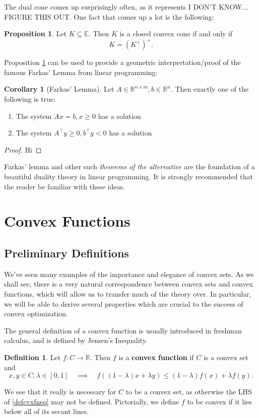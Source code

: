 \documentclass{article}
\numberwithin{equation}{section}
\theoremstyle{definition}
\newtheorem{corollary}[theorem]{Corollary}
\newtheorem{proposition}[theorem]{Proposition}
\newtheorem{definition}[theorem]{Definition}%
\newcommand{\bE}{\mathbb{E}}
\newcommand{\bR}{\mathbb{R}}
\begin{document}
The dual cone comes up surprisingly often, as it represents I DON'T KNOW... FIGURE THIS OUT. One fact that comes up a lot is the following:
\begin{proposition}
    \label{prpccciffselfdual}
    Let $K\subseteq\bE$. Then $K$ is a closed convex cone if and only if
    \begin{equation}
        K=(K^+)^+.
    \end{equation}
\end{proposition}
Proposition \ref{prpccciffselfdual} can be used to provide a geometric interpretation/proof of the famous Farkas' Lemma from linear programming:
\begin{corollary}[Farkas' Lemma]
    Let $A\in\bR^{n\times m}, b\in\bR^n$. Then exactly one of the following is true:
    \begin{enumerate}[label=(\roman*)]
        \item The system $Ax=b, x\ge 0$ has a solution
        \item The system $A^\top y\ge 0, b^\top y<0$ has a solution
    \end{enumerate}
\end{corollary}
\begin{proof}
Hi
\end{proof}
Farkas' lemma and other such \textit{theorems of the alternative} are the foundation of a beautiful duality theory in linear programming. It is strongly recommended that the reader be familiar with these ideas.
\section{Convex Functions}
\subsection{Preliminary Definitions}
We've seen many examples of the importance and elegance of convex sets. As we shall see, there is a very natural correspondence between convex sets and convex functions, which will allow us to transfer much of the theory over. In particular, we will be able to derive several properties which are crucial to the success of convex optimization.

The general definition of a convex function is usually introduced in freshman calculus, and is defined by Jensen's Inequality.
\begin{definition}
    Let $f:C\to\bR$. Then $f$ is a \textbf{convex function} if $C$ is a convex set and
    \begin{equation}
        \label{defcvxfneq}
        x, y\in C, \lambda\in[0, 1]\quad\implies\quad f((1-\lambda)x+\lambda y)\le (1-\lambda)f(x)+\lambda f(y).
    \end{equation}
\end{definition}
We see that it really is necessary for $C$ to be a convex set, as otherwise the LHS of \ref{defcvxfneq} may not be defined. Pictorially, we define $f$ to be convex if it lies below all of its secant lines.
\end{document}
